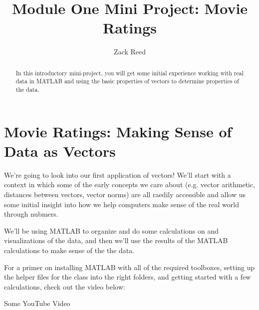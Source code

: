 \documentclass{ximera}
\author{Zack Reed}
\title{Module One Mini Project: Movie Ratings}
\begin{document}
\begin{abstract}

    In this introductory mini-project, you will get some initial experience working with real data in MATLAB and using the basic properties of vectors to determine properties of the data.

\end{abstract}
\maketitle

\section*{Movie Ratings: Making Sense of Data as Vectors}

  We're going to look into our first application of vectors! We'll start with a context in which some of the early concepts we care about (e.g. vector arithmetic, distances between vectors, vector norms) are all raedily accessible and allow us some initial insight into how we help computers make sense of the real world through nubmers. 

  We'll be using MATLAB to organize and do some calculations on and visualizations of the data, and then we'll use the results of the MATLAB calculations to make sense of the the data. 

  \begin{summary} 

    For a primer on installing MATLAB with all of the required toolboxes, setting up the helper files for the class into the right folders, and getting started with a few calculations, check out the video below:

    \begin{center}
      Some YouTube Video
    \end{center}

  \end{summary}
\end{document}
